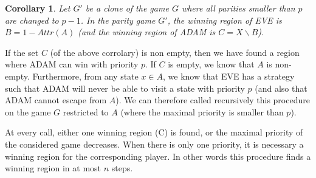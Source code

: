 \documentclass{article}
\newtheorem{corollary}{Corollary}
\begin{document}
\begin{corollary}
Let $G'$ be a clone of the game $G$ where all parities smaller than $p$ are changed to $p-1$. In the parity game $G'$, the winning region of EVE is $B = 1-Attr(A)$ (and the winning region of ADAM is $C=X \backslash B$).
\end{corollary}
If the set $C$ (of the above corrolary) is non empty, then we have found a region where ADAM can win with priority $p$.
If $C$ is empty, we know that $A$ is non-empty.
Furthermore, from any state $x \in A$, we know that EVE has a strategy such that ADAM will never be able to visit a state with priority $p$ (and also that ADAM cannot escape from $A$). We can therefore called recursively this procedure on the game $G$ restricted to $A$ (where the maximal priority is smaller than $p$).

At every call, either one winning region (C) is found, or the maximal priority of the considered game decreases. When there is only one priority, it is necessary a winning region for the corresponding player. In other words this procedure finds a winning region in at most $n$ steps. 






 
\end{document}
